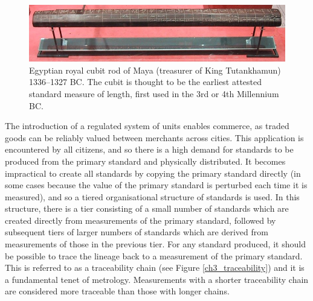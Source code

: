 \documentclass[../thesis.tex]{subfiles}
\begin{document}
\begin{refsection}
\begin{figure}
	\centering
	\includegraphics[width=\textwidth]{cubit}
	\caption{Egyptian royal cubit rod of Maya (treasurer of King Tutankhamun) 1336--1327 BC. The cubit is thought to be the earliest attested standard measure of length, first used in the 3rd or 4th Millennium BC.}
	\label{ch3_cubit}
\end{figure}

The introduction of a regulated system of units enables commerce, as traded goods can be reliably valued between merchants across cities. This application is encountered by all citizens, and so there is a high demand for standards to be produced from the primary standard and physically distributed. It becomes impractical to create all standards by copying the primary standard directly (in some cases because the value of the primary standard is perturbed each time it is measured), and so a tiered organisational structure of standards is used. In this structure, there is a tier consisting of a small number of standards which are created directly from measurements of the primary standard, followed by subsequent tiers of larger numbers of standards which are derived from measurements of those in the previous tier. For any standard produced, it should be possible to trace the lineage back to a measurement of the primary standard. This is referred to as a traceability chain (see Figure \ref{ch3_traceability}) and it is a fundamental tenet of metrology. Measurements with a shorter traceability chain are considered more traceable than those with longer chains.


\end{refsection}
\end{document}
